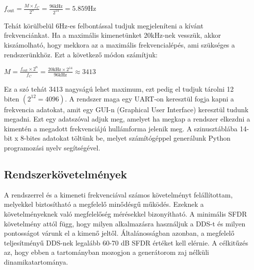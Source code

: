 \documentclass[a4paper,12pt]{article}
\begin{document}
	\begin{center}
		$f_{\text{out}} = \frac{M \times f_C}{2^n} = \frac{96 \text{kHz}}{2^{14}} = 5.859 \text{Hz}$
	\end{center}
	Tehát körülbelül 6Hz-es felbontással tudjuk megjeleníteni a kívánt frekvenciánkat. 
	Ha a maximális kimenetünket 20kHz-nek vesszük, akkor kiszámolható, hogy mekkora az a maximális frekvencialépés, ami szükséges a rendszerünkhöz. Ezt a következő módon számítjuk:
	\begin{center}
		$M = \frac{f_{\text{out}} \times 2^n}{f_C} = \frac{20\text{kHz} \times 2^{14}}{96\text{kHz}} \approx 3413$
	\end{center}
	Ez a szó tehát 3413 nagyságú lehet maximum, ezt pedig el tudjuk tárolni 12 biten $(2^{12}=4096)$.
	A rendszer maga egy UART-on keresztül fogja kapni a frekvencia adatokat, amit egy GUI-n (Graphical User Interface) keresztül tudunk megadni. Ezt egy adatszóval adjuk meg, amelyet ha megkap a rendszer elkezdni a kimentén a megadott frekvenciájú hullámforma jelenik meg.
	A szinusztáblába 14-bit x 8-bites adatokat töltünk be, melyet számítógéppel generálunk Python programozási nyelv segítségével. 
	
	\subsection{Rendszerkövetelmények}
	A rendszerrel és a kimeneti frekvenciával számos követelményt felállítottam, melyekkel biztosítható a megfelelő minődésgű működés. Ezeknek a követelményeknek való megfelelőség mérésekkel bizonyítható. A minimális SFDR követelmény attól függ, hogy milyen alkalmazásra használjuk a DDS-t és milyen pontosságot várunk el a kimenő jeltől. Általánosságban azonban, a megfelelő teljesítményű DDS-nek legalább 60-70 dB SFDR értéket kell elérnie. A célkitűzés az, hogy ebben a tartományban mozogjon a generátorom zaj nélküli dinamikatartománya.
	
\end{document}
